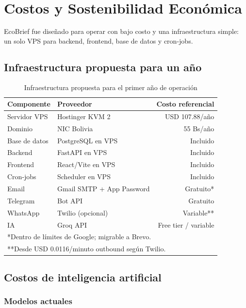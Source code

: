 \chapter{Costos y Sostenibilidad Econ\'omica}

EcoBrief fue dise\~nado para operar con bajo costo y una infraestructura simple: un solo VPS para backend, frontend, base de datos y cron-jobs.

\section{Infraestructura propuesta para un a\~no}

\begin{table}[H]
\centering
\begin{tabular}{lp{5cm}r}
\toprule
\textbf{Componente} & \textbf{Proveedor} & \textbf{Costo referencial} \\
\midrule
Servidor VPS & Hostinger KVM 2 & USD 107.88/a\~no \\
Dominio & NIC Bolivia & 55 Bs/a\~no \\
Base de datos & PostgreSQL en VPS & Incluido \\
Backend & FastAPI en VPS & Incluido \\
Frontend & React/Vite en VPS & Incluido \\
Cron-jobs & Scheduler en VPS & Incluido \\
Email & Gmail SMTP + App Password & Gratuito* \\
Telegram & Bot API & Gratuito \\
WhatsApp & Twilio (opcional) & Variable** \\
IA & Groq API & Free tier / variable \\
\bottomrule
\multicolumn{3}{l}{*Dentro de l\'imites de Google; migrable a Brevo.}\\
\multicolumn{3}{l}{**Desde USD 0.0116/minuto outbound seg\'un Twilio.}
\end{tabular}
\caption{Infraestructura propuesta para el primer a\~no de operaci\'on}
\end{table}

\section{Costos de inteligencia artificial}

\subsection{Modelos actuales}

